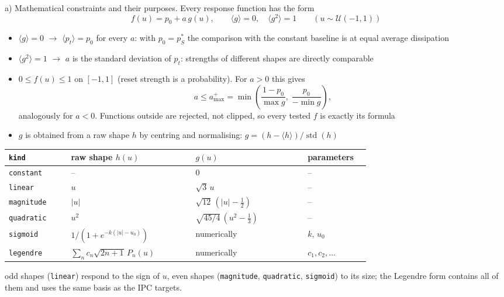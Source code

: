 a) Mathematical constraints and their purposes. Every response function has the form
\begin{equation*}
    f(u) = p_0 + a\, g(u), \qquad \langle g \rangle = 0, \quad \langle g^2 \rangle = 1 \qquad (u \sim \mathcal{U}(-1, 1))
\end{equation*}
\begin{itemize}
    \item $\langle g \rangle = 0$ $\to$ $\langle p_t \rangle = p_0$ for every $a$: with $p_0 = p^*_S$ the comparison
    with the constant baseline is at equal average dissipation
    \item $\langle g^2 \rangle = 1$ $\to$ $a$ is the standard deviation of $p_t$: strengths of different shapes are
    directly comparable
    \item $0 \le f(u) \le 1$ on $[-1, 1]$ (reset strength is a probability). For $a > 0$ this gives
    \begin{equation*}
        a \le a_{\max}^{+} = \min\left( \frac{1 - p_0}{\max g},\; \frac{p_0}{-\min g} \right),
    \end{equation*}
    analogously for $a < 0$. Functions outside are rejected, not clipped, so every tested $f$ is exactly its formula
    \item $g$ is obtained from a raw shape $h$ by centring and normalising: $g = (h - \langle h \rangle) / \operatorname{std}(h)$
\end{itemize}
\begin{center}
\begin{tabular}{p{0.15\linewidth}p{0.3\linewidth}p{0.27\linewidth}p{0.15\linewidth}}
    \hline
    \texttt{kind} & raw shape $h(u)$ & $g(u)$ & parameters \\
    \hline
    \texttt{constant} & -- & $0$ & -- \\
    \texttt{linear} & $u$ & $\sqrt{3}\, u$ & -- \\
    \texttt{magnitude} & $\lvert u \rvert$ & $\sqrt{12}\,(\lvert u \rvert - \frac12)$ & -- \\
    \texttt{quadratic} & $u^2$ & $\sqrt{45/4}\,(u^2 - \frac13)$ & -- \\
    \texttt{sigmoid} & $1 / (1 + e^{-k(\lvert u \rvert - u_0)})$ & numerically & $k$, $u_0$ \\
    \texttt{legendre} & $\sum_n c_n \sqrt{2n+1}\, P_n(u)$ & numerically & $c_1, c_2, \ldots$ \\
    \hline
\end{tabular}
\end{center}
odd shapes (\texttt{linear}) respond to the sign of $u$, even shapes (\texttt{magnitude}, \texttt{quadratic},
\texttt{sigmoid}) to its size; the Legendre form contains all of them and uses the same basis as the IPC targets.

